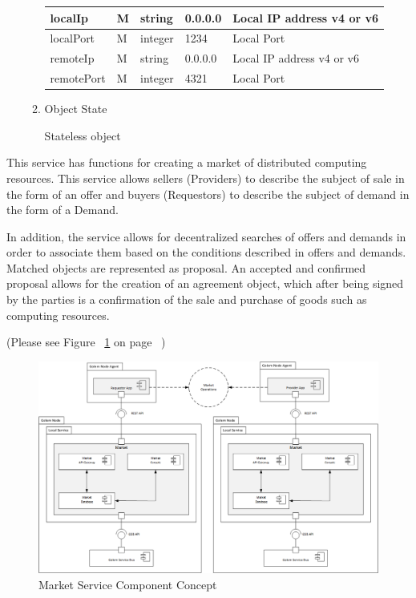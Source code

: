 \begin{enumerate}
\begin{enumerate}
\begin{table}[H]
\begin{center}
\begin{tabular}{|p{3cm}|l|p{3cm}|p{3cm}|p{4cm}|}
localIp 		& M & string  & 0.0.0.0	& Local IP address v4 or v6 \\
\hline

localPort 		& M & integer & 1234	& Local Port \\
\hline 

remoteIp 		& M & string  & 0.0.0.0	& Local IP address v4 or v6 \\
\hline

remotePort 		& M & integer & 4321	& Local Port \\
\hline 

\end{tabular}
\end{center}

\end{table}

\item Object State

Stateless object

\end{enumerate}


\end{enumerate}

\break


This service has functions for creating a market of distributed computing resources.
This service allows sellers (Providers) to describe the subject of sale in the form of an offer
and buyers (Requestors) to describe the subject of demand in the form of a Demand.

In addition, the service allows for decentralized searches of offers and demands in order to associate them
based on the conditions described in offers and demands. Matched objects are represented as
proposal. An accepted and confirmed proposal allows for the creation of an agreement object, which
after being signed by the parties is a confirmation of the sale and purchase of goods such as computing resources.

(Please see Figure ~\ref{fig:MSCC} on page ~\pageref{fig:MSCC})

\begin{figure}[H]
    \centering
    \includegraphics[width=12cm,angle=0]{./diag/Reference/MarketService-Reference.png}
	\caption{Market Service Component Concept}
    \label{fig:MSCC}
\end{figure}


